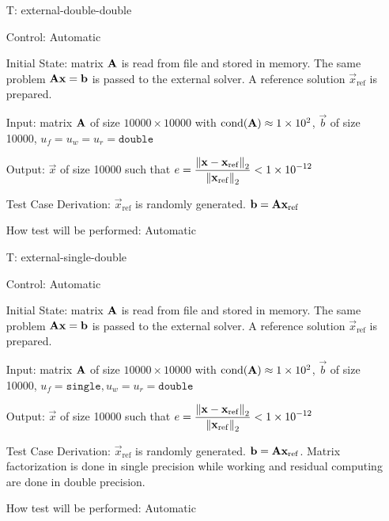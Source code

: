 \documentclass[12pt, titlepage]{article}
\newcounter{testnum} %
\begin{document}
\begin{itemize}

\item[T\refstepcounter{testnum}\thetestnum \label{T:exdd}:]{external-double-double}

Control: Automatic

Initial State: matrix \(\mathbf{A}\) is read from file and stored in memory. The
same problem \(\mathbf{A}\mathbf{x} = \mathbf{b}\) is passed to the external solver. A
reference solution \(\vec{x}_\mathrm{ref}\) is prepared.

Input: matrix \(\mathbf{A}\) of size \(\num{10000} \times \num{10000}\) with
\(\mathrm{cond}(\mathbf{A}) \approx \num{1e2}\), \(\vec{b}\) of size \num{10000}, \(u_f =
u_w = u_r = \texttt{double}\)

Output: \(\vec{x}\) of size \num{10000} such that \(e = \displaystyle \frac{\left\lVert\mathbf{x} -
    \mathbf{x}_\mathrm{ref}\right\rVert_2}{\left\lVert\mathbf{x}_\mathrm{ref}\right\rVert_2} < \num{1e-12}\)

Test Case Derivation: \(\vec{x}_\mathrm{ref}\) is randomly generated. \(\mathbf{b} = \mathbf{A}\mathbf{x}_\mathrm{ref}\)

How test will be performed: Automatic

\item[T\refstepcounter{testnum}\thetestnum \label{T:exsd}:]{external-single-double}

Control: Automatic

Initial State: matrix \(\mathbf{A}\) is read from file and stored in memory. The
same problem \(\mathbf{A}\mathbf{x} = \mathbf{b}\) is passed to the external solver. A
reference solution \(\vec{x}_\mathrm{ref}\) is prepared.

Input: matrix \(\mathbf{A}\) of size \(\num{10000} \times \num{10000}\) with
\(\mathrm{cond}(\mathbf{A}) \approx \num{1e2}\), \(\vec{b}\) of size \num{10000}, \(u_f = \texttt{single}, u_w
= u_r = \texttt{double}\)

Output: \(\vec{x}\) of size \num{10000} such that \(e = \displaystyle \frac{\left\lVert\mathbf{x} -
    \mathbf{x}_\mathrm{ref}\right\rVert_2}{\left\lVert\mathbf{x}_\mathrm{ref}\right\rVert_2} < \num{1e-12}\)

Test Case Derivation: \(\vec{x}_\mathrm{ref}\) is randomly generated. \(\mathbf{b} =
\mathbf{A}\mathbf{x}_\mathrm{ref}\). Matrix factorization is done in single precision while
working and residual computing are done in double precision.

How test will be performed: Automatic

\end{itemize}
\end{document}
